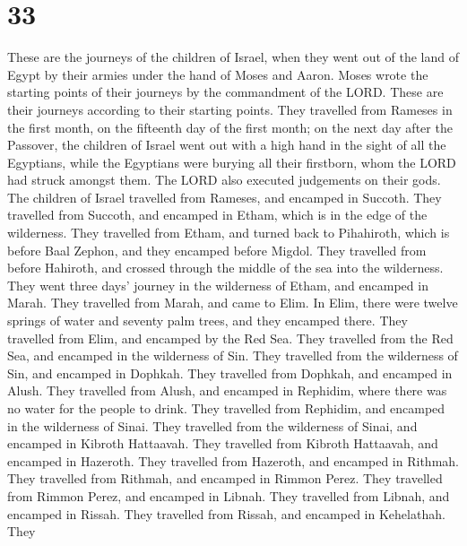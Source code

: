 \hypertarget{section-32}{%
\section{33}\label{section-32}}

 These are the journeys of the children of Israel, when they
went out of the land of Egypt by their armies under the hand of Moses
and Aaron.  Moses wrote the starting points of their
journeys by the commandment of the LORD. These are their journeys
according to their starting points.  They travelled from
Rameses in the first month, on the fifteenth day of the first month; on
the next day after the Passover, the children of Israel went out with a
high hand in the sight of all the Egyptians,  while the
Egyptians were burying all their firstborn, whom the LORD had struck
amongst them. The LORD also executed judgements on their gods.
 The children of Israel travelled from Rameses, and encamped
in Succoth.  They travelled from Succoth, and encamped in
Etham, which is in the edge of the wilderness.  They
travelled from Etham, and turned back to Pihahiroth, which is before
Baal Zephon, and they encamped before Migdol.  They
travelled from before Hahiroth, and crossed through the middle of the
sea into the wilderness. They went three days' journey in the wilderness
of Etham, and encamped in Marah.  They travelled from Marah,
and came to Elim. In Elim, there were twelve springs of water and
seventy palm trees, and they encamped there.  They
travelled from Elim, and encamped by the Red Sea.  They
travelled from the Red Sea, and encamped in the wilderness of Sin.
 They travelled from the wilderness of Sin, and encamped in
Dophkah.  They travelled from Dophkah, and encamped in
Alush.  They travelled from Alush, and encamped in
Rephidim, where there was no water for the people to drink.
 They travelled from Rephidim, and encamped in the
wilderness of Sinai.  They travelled from the wilderness of
Sinai, and encamped in Kibroth Hattaavah.  They travelled
from Kibroth Hattaavah, and encamped in Hazeroth.  They
travelled from Hazeroth, and encamped in Rithmah.  They
travelled from Rithmah, and encamped in Rimmon Perez.  They
travelled from Rimmon Perez, and encamped in Libnah.  They
travelled from Libnah, and encamped in Rissah.  They
travelled from Rissah, and encamped in Kehelathah.  They
